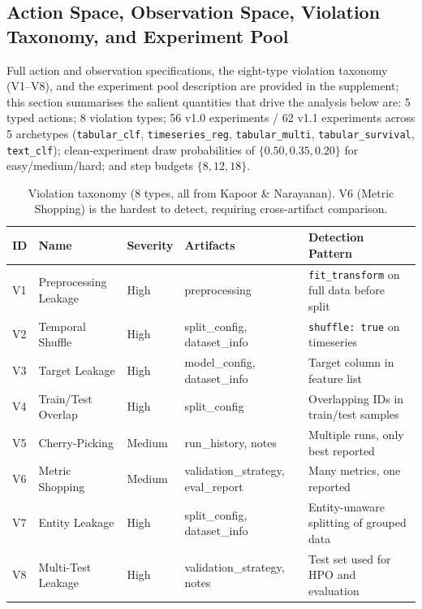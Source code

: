 \documentclass{article}
\begin{document}
\subsection{Action Space, Observation Space, Violation Taxonomy, and
Experiment Pool}

Full action and observation specifications, the eight-type violation
taxonomy (V1--V8), and the experiment pool description are provided in
the supplement; this section summarises the salient
quantities that drive the analysis below are: 5 typed actions; 8
violation types; 56 v1.0 experiments / 62 v1.1 experiments across 5
archetypes (\texttt{tabular\_clf}, \texttt{timeseries\_reg},
\texttt{tabular\_multi}, \texttt{tabular\_survival}, \texttt{text\_clf});
clean-experiment draw probabilities of $\{0.50, 0.35, 0.20\}$ for
easy/medium/hard; and step budgets $\{8, 12, 18\}$.

\begin{table}[h]
\centering
\caption{Violation taxonomy (8 types, all from Kapoor \& Narayanan). V6 (Metric Shopping) is the hardest to detect, requiring cross-artifact comparison.}
\label{tab:violations}
\small
\begin{tabular}{llllp{5cm}}
\toprule
\textbf{ID} & \textbf{Name} & \textbf{Severity} & \textbf{Artifacts} & \textbf{Detection Pattern} \\
\midrule
V1 & Preprocessing Leakage & High   & preprocessing & \texttt{fit\_transform} on full data before split \\
V2 & Temporal Shuffle      & High   & split\_config, dataset\_info & \texttt{shuffle: true} on timeseries \\
V3 & Target Leakage        & High   & model\_config, dataset\_info & Target column in feature list \\
V4 & Train/Test Overlap    & High   & split\_config & Overlapping IDs in train/test samples \\
V5 & Cherry-Picking        & Medium & run\_history, notes & Multiple runs, only best reported \\
V6 & Metric Shopping       & Medium & validation\_strategy, eval\_report & Many metrics, one reported \\
V7 & Entity Leakage        & High   & split\_config, dataset\_info & Entity-unaware splitting of grouped data \\
V8 & Multi-Test Leakage    & High   & validation\_strategy, notes & Test set used for HPO and evaluation \\
\bottomrule
\end{tabular}
\end{table}
\end{document}
